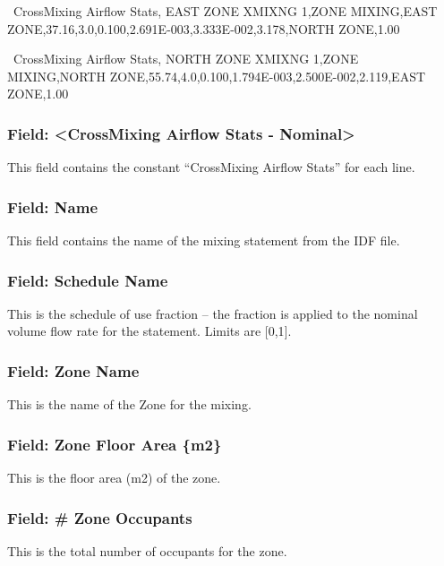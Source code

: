 ~CrossMixing Airflow Stats, EAST ZONE XMIXNG 1,ZONE MIXING,EAST ZONE,37.16,3.0,0.100,2.691E-003,3.333E-002,3.178,NORTH ZONE,1.00

~CrossMixing Airflow Stats, NORTH ZONE XMIXNG 1,ZONE MIXING,NORTH ZONE,55.74,4.0,0.100,1.794E-003,2.500E-002,2.119,EAST ZONE,1.00

\subsubsection{Field: \textless{}CrossMixing Airflow Stats - Nominal\textgreater{}}\label{field-crossmixing-airflow-stats---nominal}

This field contains the constant ``CrossMixing Airflow Stats'' for each line.

\subsubsection{Field: Name}\label{field-name-9}

This field contains the name of the mixing statement from the IDF file.

\subsubsection{Field: Schedule Name}\label{field-schedule-name-8}

This is the schedule of use fraction -- the fraction is applied to the nominal volume flow rate for the statement. Limits are {[}0,1{]}.

\subsubsection{Field: Zone Name}\label{field-zone-name-10}

This is the name of the Zone for the mixing.

\subsubsection{Field: Zone Floor Area \{m2\}}\label{field-zone-floor-area-m2-8}

This is the floor area (m2) of the zone.

\subsubsection{Field: \# Zone Occupants}\label{field-zone-occupants-8}

This is the total number of occupants for the zone.

